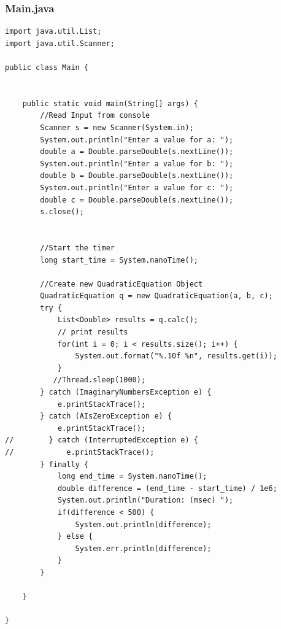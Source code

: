 \documentclass[a4paper,12pt,twoside]{scrreprt}
\begin{document}
\subsubsection{Main.java}
\begin{lstlisting}[basicstyle=\small]
import java.util.List;
import java.util.Scanner;

public class Main {


    public static void main(String[] args) {
        //Read Input from console
        Scanner s = new Scanner(System.in);
        System.out.println("Enter a value for a: ");
        double a = Double.parseDouble(s.nextLine());
        System.out.println("Enter a value for b: ");
        double b = Double.parseDouble(s.nextLine());
        System.out.println("Enter a value for c: ");
        double c = Double.parseDouble(s.nextLine());
        s.close();


        //Start the timer
        long start_time = System.nanoTime();

        //Create new QuadraticEquation Object
        QuadraticEquation q = new QuadraticEquation(a, b, c);
        try {
            List<Double> results = q.calc();
            // print results
            for(int i = 0; i < results.size(); i++) {
                System.out.format("%.10f %n", results.get(i));
            }
           //Thread.sleep(1000);
        } catch (ImaginaryNumbersException e) {
            e.printStackTrace();
        } catch (AIsZeroException e) {
            e.printStackTrace();
//        } catch (InterruptedException e) {
//            e.printStackTrace();
        } finally {
            long end_time = System.nanoTime();
            double difference = (end_time - start_time) / 1e6;
            System.out.println("Duration: (msec) ");
            if(difference < 500) {
                System.out.println(difference);
            } else {
                System.err.println(difference);
            }
        }

    }

}
\end{lstlisting}
\end{document}
